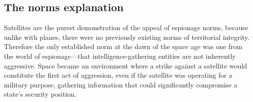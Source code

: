 \documentclass{memoir}
\begin{document}
\subsection{The norms explanation}
Satellites are the purest demonstration of the appeal of espionage norms, because unlike with planes, there were no previously existing norms of territorial integrity. Therefore the only established norm at the dawn of the space age was one from the world of espionage---that intelligence-gathering entities are not inherently aggressive. Space became an environment where a strike against a satellite would constitute the first act of aggression, even if the satellite was operating for a military purpose, gathering information that could significantly compromise a state's security position.


\end{document}
